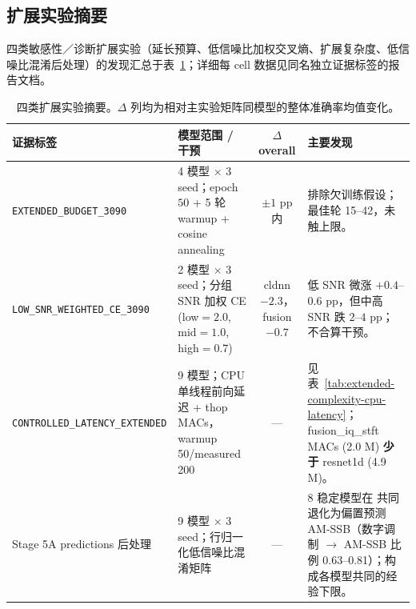 \subsection{扩展实验摘要}\label{sec:results-extended-summary}

四类敏感性／诊断扩展实验（延长预算、低信噪比加权交叉熵、扩展复杂度、低信噪比混淆后处理）的发现汇总于表~\ref{tab:extended-summary}；详细每 cell 数据见同名独立证据标签的报告文档。

\begin{table}[htbp]
  \centering
  \caption{四类扩展实验摘要。$\Delta$ 列均为相对主实验矩阵同模型的整体准确率均值变化。}
  \label{tab:extended-summary}
  \small
  \begin{tabularx}{\textwidth}{lXcX}
    \toprule
    证据标签 & 模型范围 / 干预 & $\Delta$ overall & 主要发现 \\
    \midrule
    \texttt{EXTENDED\_BUDGET\_3090} & 4 模型 \(\times\) 3 seed；epoch \(50\) + 5 轮 warmup + cosine annealing & \(\pm 1\) pp 内 & 排除欠训练假设；最佳轮 15--42，未触上限。 \\    \texttt{LOW\_SNR\_WEIGHTED\_CE\_3090} & 2 模型 \(\times\) 3 seed；分组 SNR 加权 CE (low\(=2.0\), mid\(=1.0\), high\(=0.7\)) & cldnn \(-2.3\)，fusion \(-0.7\) & 低 SNR 微涨 \(+0.4\)--\(0.6\) pp，但中高 SNR 跌 \(2\)--\(4\) pp；不合算干预。 \\
    \texttt{CONTROLLED\_LATENCY\_EXTENDED} & 9 模型；CPU 单线程前向延迟 + thop MACs，warmup 50/measured 200 & — & 见表~\ref{tab:extended-complexity-cpu-latency}；fusion\_iq\_stft MACs (2.0 M) \textbf{少于} resnet1d (4.9 M)。 \\
    Stage 5A predictions 后处理 & 9 模型 \(\times\) 3 seed；行归一化低信噪比混淆矩阵 & — & 8 稳定模型在 \lowSNR{} 共同退化为偏置预测 AM-SSB（数字调制 \(\to\) AM-SSB 比例 0.63--0.81）；构成各模型共同的经验下限。 \\
    \bottomrule
  \end{tabularx}
\end{table}


